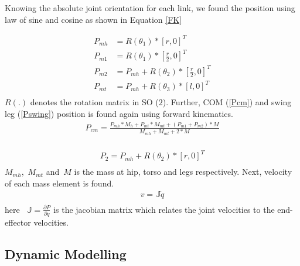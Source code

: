 \documentclass[letterpaper, 10 pt, conference]{ieeeconf}  %
\begin{document}
Knowing the absolute joint orientation for each link, we found the position using law of sine and cosine as shown in Equation \ref{FK}

%
\begin{equation}
\begin{aligned}
    P_{mh} &= R(\theta_{1})*[r,0]^{T} \\
    P_{m1} &= R(\theta_{1})*[\frac{r}{2},0]^{T} \\
    P_{m2} &= P_{mh} + R(\theta_{2})*[\frac{r}{2},0]^{T} \\
    P_{mt} &= P_{mh} + R(\theta_{3})*[l,0]^{T} \\
\end{aligned}
\label{FK}
\end{equation}
%
$R(.)$ denotes the rotation matrix in SO ($2$). Further, COM (\ref{Pcm}) and swing leg (\ref{Pswing}) position is found again using forward kinematics.
%
\begin{equation}
\begin{aligned}
    P_{cm} = \frac{P_{mh}*M_{h} + P_{mt}*M_{mt} + (P_{m1} + P_{m2})*M}{M_{mh} + M_{mt} + 2*M} \\
    \end{aligned}
\label{Pcm}
\end{equation}
%

%
\begin{equation}
\begin{aligned}
    P_{2} = P_{mh} + R(\theta_{2})*[r,0]^{T} \\
\end{aligned}
\label{Pswing}
\end{equation}
%
$M_{mh}$,~$M_{mt}$ and~$M$ is the mass at hip, torso and legs respectively. 
Next, velocity of each mass element is found.
%
\begin{equation}
\begin{aligned}
    v = \mathbb{J}\dot{q} \\
\end{aligned}
\label{Pswing}
\end{equation}
%
here ~$\mathbb{J} = \frac{\partial P}{\partial q}$ is the jacobian matrix which relates the joint velocities to the end-effector velocities.

\subsection{Dynamic Modelling}
\end{document}
